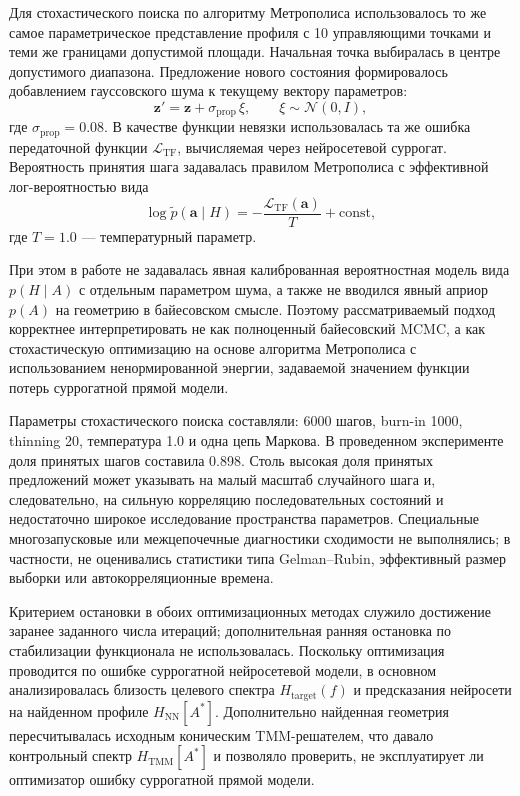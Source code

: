 Для стохастического поиска по алгоритму Метрополиса использовалось то же самое параметрическое представление профиля с 10 управляющими точками и теми же границами допустимой площади. Начальная точка выбиралась в центре допустимого диапазона. Предложение нового состояния формировалось добавлением гауссовского шума к текущему вектору параметров:
\begin{equation}
    \mathbf{z}' = \mathbf{z} + \sigma_{\mathrm{prop}} \, \xi, \qquad \xi \sim \mathcal{N}(0, I),
\end{equation}
где $\sigma_{\mathrm{prop}} = 0.08$. В качестве функции невязки использовалась та же ошибка передаточной функции $\mathcal{L}_{\mathrm{TF}}$, вычисляемая через нейросетевой суррогат. Вероятность принятия шага задавалась правилом Метрополиса с эффективной лог-вероятностью вида
\begin{equation}
    \log \widetilde{p}(\mathbf{a} \mid H) = -\frac{\mathcal{L}_{\mathrm{TF}}(\mathbf{a})}{T} + \mathrm{const},
\end{equation}
где $T=1.0$ --- температурный параметр.

При этом в работе не задавалась явная калиброванная вероятностная модель вида $p(H \mid A)$ с отдельным параметром шума, а также не вводился явный априор $p(A)$ на геометрию в байесовском смысле. Поэтому рассматриваемый подход корректнее интерпретировать не как полноценный байесовский MCMC, а как стохастическую оптимизацию на основе алгоритма Метрополиса с использованием ненормированной энергии, задаваемой значением функции потерь суррогатной прямой модели.

Параметры стохастического поиска составляли: 6000 шагов, burn-in 1000, thinning 20, температура 1.0 и одна цепь Маркова. В проведенном эксперименте доля принятых шагов составила 0.898. Столь высокая доля принятых предложений может указывать на малый масштаб случайного шага и, следовательно, на сильную корреляцию последовательных состояний и недостаточно широкое исследование пространства параметров. Специальные многозапусковые или межцепочечные диагностики сходимости не выполнялись; в частности, не оценивались статистики типа Gelman--Rubin, эффективный размер выборки или автокорреляционные времена.

Критерием остановки в обоих оптимизационных методах служило достижение заранее заданного числа итераций; дополнительная ранняя остановка по стабилизации функционала не использовалась. Поскольку оптимизация проводится по ошибке суррогатной нейросетевой модели, в основном анализировалась близость целевого спектра $H_{\mathrm{target}}(f)$ и предсказания нейросети на найденном профиле $H_{\mathrm{NN}}[A^\ast]$. Дополнительно найденная геометрия пересчитывалась исходным коническим TMM-решателем, что давало контрольный спектр $H_{\mathrm{TMM}}[A^\ast]$ и позволяло проверить, не эксплуатирует ли оптимизатор ошибку суррогатной прямой модели.

